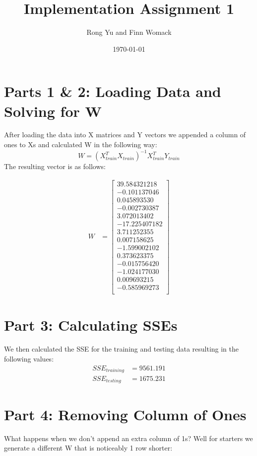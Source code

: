 \documentclass{article}
\title{Implementation Assignment 1}
\date{\today}
\author{Rong Yu and Finn Womack}
\begin{document}
	\maketitle
	\section*{Parts 1 \& 2: Loading Data and Solving for W}
After loading the data into X matrices and Y vectors we appended a column of ones to Xs and calculated W in the following way:
	$$
	W = (X_{train}^{T}X_{train})^{-1}X_{train}^{T}Y_{train}
	$$
	The resulting vector is as follows:
	
	\begin{align}
		W &= \begin{bmatrix}
			39.584321218 \\
			-0.101137046 \\
			0.045893530 \\
			-0.002730387 \\
			3.072013402 \\
			-17.225407182 \\
			3.711252355 \\
			0.007158625 \\
			-1.599002102 \\
			0.373623375 \\
			-0.015756420 \\
			-1.024177030 \\
			0.009693215 \\
			-0.585969273 \\
		\end{bmatrix}
	\end{align}
	
	\section*{Part 3: Calculating SSEs}
	
We then calculated the SSE for the training and testing data resulting in the following values:
	\begin{align}
		SSE_{training} &= 9561.191 \\
		SSE_{testing} &= 1675.231
	\end{align}

	\section*{Part 4: Removing Column of Ones}
What happens when we don't append an extra column of 1s? Well for starters we generate a different W that is noticeably 1 row shorter:
	
\end{document}
